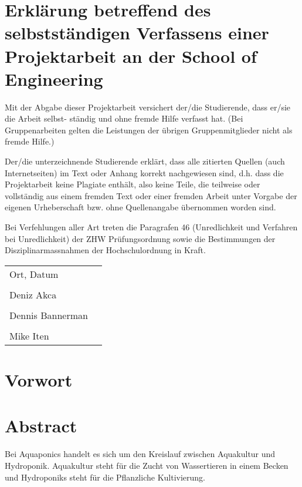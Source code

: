 \documentclass[../main.tex]{subfiles}
\begin{document}
	
	\section*{Erklärung betreffend des selbstständigen Verfassens einer Projektarbeit an der School of Engineering}
	
	Mit der Abgabe dieser Projektarbeit versichert der/die Studierende, dass er/sie die Arbeit selbst-
	ständig und ohne fremde Hilfe verfasst hat. (Bei Gruppenarbeiten gelten die Leistungen der übrigen
	Gruppenmitglieder nicht als fremde Hilfe.)\vspace{5mm}
	
	Der/die unterzeichnende Studierende erklärt, dass alle zitierten Quellen (auch Internetseiten) im Text
	oder Anhang korrekt nachgewiesen sind, d.h. dass die Projektarbeit keine Plagiate enthält, also keine
	Teile, die teilweise oder vollständig aus einem fremden Text oder einer fremden Arbeit unter Vorgabe der
	eigenen Urheberschaft bzw. ohne Quellenangabe übernommen worden sind.\vspace{5mm}
	
	Bei Verfehlungen aller Art treten die Paragrafen 46 (Unredlichkeit und Verfahren bei Unredlichkeit) der
	ZHW Prüfungsordnung sowie die Bestimmungen der Disziplinarmassnahmen der Hochschulordnung in
	Kraft.\vspace{15mm}
	
	\noindent\begin{tabular}{@{}p{2.5in}p{2.5in}@{}}
		Ort, Datum                       & \dotfill\\
		\\
		Deniz Akca                       & \dotfill\\
		\\
		Dennis Bannerman                 & \dotfill\\
		\\
		Mike Iten                        & \dotfill\\
	\end{tabular} 
	
	\newpage
	
	\section{Vorwort}
	
	
	\section{Abstract}
	Bei Aquaponics handelt es sich um den Kreislauf zwischen Aquakultur und Hydroponik. Aquakultur steht für die Zucht von Wassertieren in einem Becken und Hydroponiks steht für die Pflanzliche Kultivierung. \\
	
\end{document}
